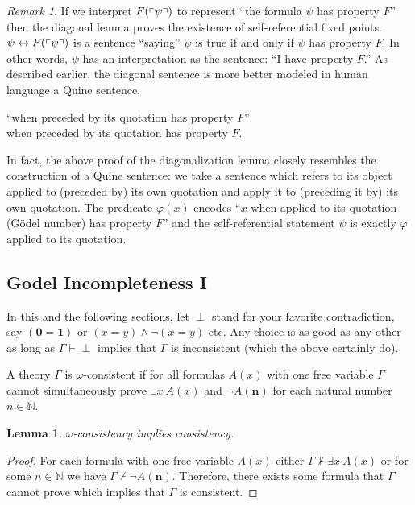 \documentclass[12pt, leqno]{article}
\newcommand{\N}{\mathbb{N}}
\renewcommand{\bf}[1]{\mathbf{#1}}
\newcommand{\proves}{\vdash}
\newcommand{\eq}[1]{\exists{#1} \:}
\newenvironment{definition}[1][Definition:]{\begin{trivlist}
\item[\hskip \labelsep {\bfseries #1}]}{\end{trivlist}}
\theoremstyle{theorem}
\newtheorem{lemma}[theorem]{Lemma}
\theoremstyle{definition}
\theoremstyle{definition}
\theoremstyle{remark}
\theoremstyle{definition}
\theoremstyle{remark}
\newtheorem{remark}{Remark}[subsection]
\begin{document}
\begin{remark}
If we interpret $F(\left\ulcorner \psi \right\urcorner)$ to represent ``the formula $\psi$ has property $F$'' then the diagonal lemma proves the existence of self-referential fixed points. $\psi \leftrightarrow F(\left\ulcorner \psi \right\urcorner)$ is a sentence ``saying'' $\psi$ is true if and only if $\psi$ has property $F$. In other words, $\psi$ has an interpretation as the sentence: ``I have property $F$.'' 
As described earlier, the diagonal sentence is more better modeled in human language a Quine sentence,
\begin{center}
``when preceded by its quotation has property $F$''
\\ when preceded by its quotation has property $F$.
\end{center}
In fact, the above proof of the diagonalization lemma closely  resembles the construction of a Quine sentence: we take a sentence which refers to its object applied to (preceded by) its own quotation and apply it to (preceding it by) its own quotation. The predicate $\varphi(x)$ encodes ``$x$ when applied to its quotation (G\"{o}del number) has property $F$'' and the self-referential statement $\psi$ is exactly $\varphi$ applied to its quotation. 
\end{remark}

\subsection{Godel Incompleteness I}

In this and the following sections, let $\perp$ stand for your favorite contradiction, say $(\bf{0} = \bf{1})$ or $(x = y) \wedge \neg (x = y)$ etc. Any choice is as good as any other as long as $\Gamma \proves \perp$ implies that $\Gamma$ is inconsistent (which the above certainly do). 

\begin{definition} 
A theory $\Gamma$ is $\omega$-consistent if for all formulas $A(x)$ with one free variable $\Gamma$ cannot simultaneously prove $\eq{x} A(x)$ and $\neg A(\bf{n})$ for each natural number $n \in \N$.
\end{definition}

\begin{lemma}
$\omega$-consistency implies consistency.
\end{lemma}

\begin{proof}
For each formula with one free variable $A(x)$ either $\Gamma \not\proves \eq{x} A(x)$ or for some $n \in \N$ we have $\Gamma \not\proves \neg A(\bf{n})$. Therefore, there exists some formula that $\Gamma$ cannot prove which implies that $\Gamma$ is consistent. 
\end{proof}
\end{document}
